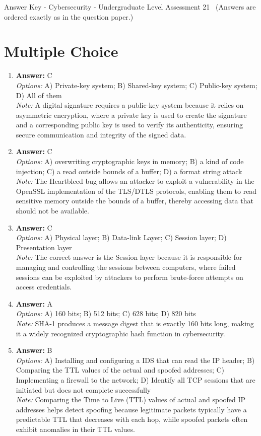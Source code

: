 \documentclass[12pt]{article}
\begin{document}
\begin{center}
Answer Key - Cybersecurity - Undergraduate Level Assessment 21 \
\small (Answers are ordered exactly as in the question paper.)
\end{center}

\section*{Multiple Choice}
\begin{enumerate}[label=\arabic*.]
\item \textbf{Answer:} C
\\ \textit{Options:} A) Private-key system; B) Shared-key system; C) Public-key system; D) All of them
\\ \textit{Note:} A digital signature requires a public-key system because it relies on asymmetric encryption, where a private key is used to create the signature and a corresponding public key is used to verify its authenticity, ensuring secure communication and integrity of the signed data.
\item \textbf{Answer:} C
\\ \textit{Options:} A) overwriting cryptographic keys in memory; B) a kind of code injection; C) a read outside bounds of a buffer; D) a format string attack
\\ \textit{Note:} The Heartbleed bug allows an attacker to exploit a vulnerability in the OpenSSL implementation of the TLS/DTLS protocols, enabling them to read sensitive memory outside the bounds of a buffer, thereby accessing data that should not be available.
\item \textbf{Answer:} C
\\ \textit{Options:} A) Physical layer; B) Data-link Layer; C) Session layer; D) Presentation layer
\\ \textit{Note:} The correct answer is the Session layer because it is responsible for managing and controlling the sessions between computers, where failed sessions can be exploited by attackers to perform brute-force attempts on access credentials.
\item \textbf{Answer:} A
\\ \textit{Options:} A) 160 bits; B) 512 bits; C) 628 bits; D) 820 bits
\\ \textit{Note:} SHA-1 produces a message digest that is exactly 160 bits long, making it a widely recognized cryptographic hash function in cybersecurity.
\item \textbf{Answer:} B
\\ \textit{Options:} A) Installing and configuring a IDS that can read the IP header; B) Comparing the TTL values of the actual and spoofed addresses; C) Implementing a firewall to the network; D) Identify all TCP sessions that are initiated but does not complete successfully
\\ \textit{Note:} Comparing the Time to Live (TTL) values of actual and spoofed IP addresses helps detect spoofing because legitimate packets typically have a predictable TTL that decreases with each hop, while spoofed packets often exhibit anomalies in their TTL values.
\end{enumerate}
\end{document}
